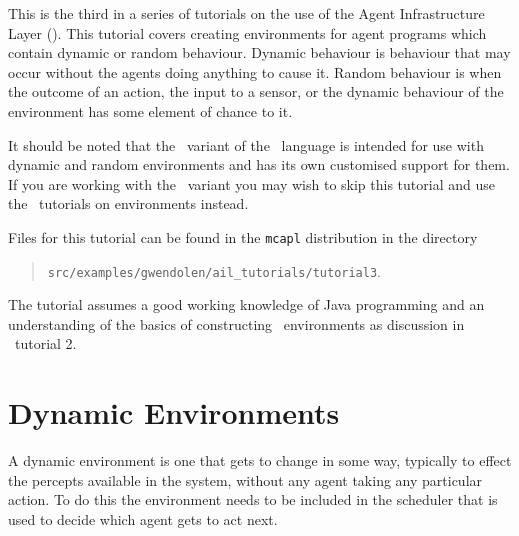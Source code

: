 
This is the third in a series of tutorials on the use of the Agent Infrastructure Layer (\ail).  This tutorial covers creating environments for agent programs which contain dynamic or random behaviour.   Dynamic behaviour is behaviour that may occur without the agents doing anything to cause it.  Random behaviour is when the outcome of an action, the input to a sensor, or the dynamic behaviour of the environment has some element of chance to it.

It should be noted that the \eass\ variant of the \gwendolen\ language is intended for use with dynamic and random environments and has its own customised support for them.  If you are working with the \eass\ variant you may wish to skip this tutorial and use the \eass\ tutorials on environments instead.

Files for this tutorial can be found in the \texttt{mcapl} distribution in the directory 
\begin{quote}
\texttt{src/examples/gwendolen/ail\_tutorials/tutorial3}.
\end{quote}

The tutorial assumes a good working knowledge of Java programming and an understanding of the basics of constructing \ail\ environments as discussion in \ail\ tutorial 2.

\section{Dynamic Environments}

A dynamic environment is one that gets to change in some way, typically to effect the percepts available in the system, without any agent taking any particular action.  To do this the environment needs to be included in the scheduler that is used to decide which agent gets to act next.

